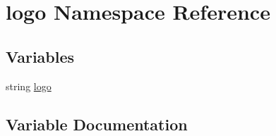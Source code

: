 \hypertarget{namespacelogo}{}\section{logo Namespace Reference}
\label{namespacelogo}
\subsection*{Variables}
\begin{DoxyCompactItemize}
\item 
string \hyperlink{namespacelogo_a9117d4fd978070a512c10339dc4132ca}{logo}
\end{DoxyCompactItemize}


\subsection{Variable Documentation}
\hypertarget{namespacelogo_a9117d4fd978070a512c10339dc4132ca}{}
